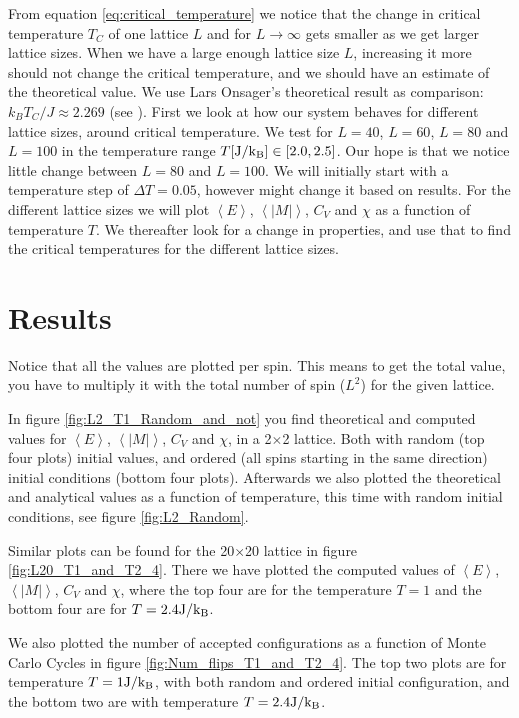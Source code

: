 \documentclass[reprint, english,notitlepage,nofootinbib]{revtex4-1}  %
\begin{document}
From equation \eqref{eq:critical_temperature} we notice that the change in critical temperature $T_C$ of one lattice $L$ and for $L\rightarrow\infty$ gets smaller as we get larger lattice sizes. When we have a large enough lattice size $L$, increasing it more should not change the critical temperature, and we should have an estimate of the theoretical value. We use Lars Onsager's theoretical result as comparison: $k_BT_C/J \approx 2.269$ (see \cite{larsonsager}). First we look at how our system behaves for different lattice sizes, around critical temperature. We test for $L=40$, $L=60$, $L=80$ and $L=100$ in the temperature range $T[\rm{J}/k_B]\in [2.0, 2.5]$. Our hope is that we notice little change between $L=80$ and $L=100$. We will initially start with a temperature step of $\Delta T = 0.05$, however might change it based on results. For the different lattice sizes we will plot $\left<E\right>$, $\left<|M|\right>$, $C_V$ and $\chi$ as a function of temperature $T$. We thereafter look for a change in properties, and use that to find the critical temperatures for the different lattice sizes.

\section{Results}
Notice that all the values are plotted per spin. This means to get the total value, you have to multiply it with the total number of spin ($L^2$) for the given lattice.

In figure \ref{fig:L2_T1_Random_and_not} you find theoretical and computed values for $\left<E\right>$, $\left<|M|\right>$, $C_V$ and $\chi$, in a 2$\times$2 lattice. Both with random (top four plots) initial values, and ordered (all spins starting in the same direction) initial conditions (bottom four plots). Afterwards we also plotted the theoretical and analytical values as a function of temperature, this time with random initial conditions, see figure \ref{fig:L2_Random}.

Similar plots can be found for the 20$\times$20 lattice in figure \ref{fig:L20_T1_and_T2_4}. There we have plotted the computed values of $\left<E\right>$, $\left<|M|\right>$, $C_V$ and $\chi$, where the top four are for the temperature $T=1$ and the bottom four are for $T=2.4\rm{J}/k_B$.

We also plotted the number of accepted configurations as a function of Monte Carlo Cycles in figure \ref{fig:Num_flips_T1_and_T2_4}. The top two plots are for temperature $T=1\rm{J}/k_B$, with both random and ordered initial configuration, and the bottom two are with temperature $T=2.4\rm{J}/k_B$.
\end{document}
